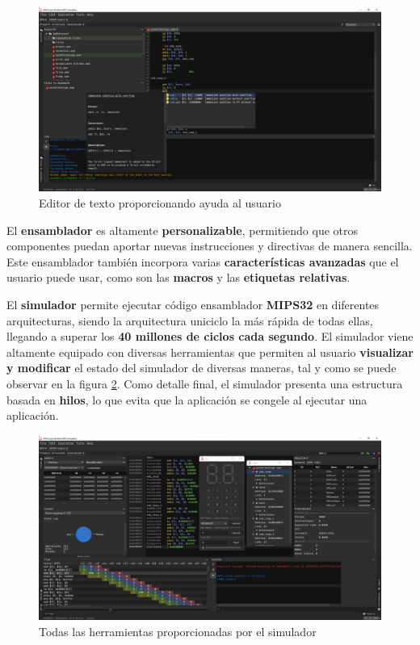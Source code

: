 \begin{figure}[h]
    \centering
    \includegraphics[width=\textwidth]{images/result/mips-editor}
    \caption{Editor de texto proporcionando ayuda al usuario}
    \label{fig:mips-editor}
\end{figure}

\noindent El \textbf{ensamblador} es altamente \textbf{personalizable},
permitiendo que otros componentes puedan aportar nuevas instrucciones y
directivas de manera sencilla.
Este ensamblador también incorpora varias \textbf{características avanzadas}
que el usuario puede usar, como son las \textbf{macros} y las
\textbf{etiquetas relativas}.

\noindent El \textbf{simulador} permite ejecutar código ensamblador
\textbf{MIPS32} en diferentes arquitecturas, siendo la arquitectura
uniciclo la más rápida de todas ellas, llegando a superar los
\textbf{40 millones de ciclos cada segundo}.
El simulador viene altamente equipado con diversas herramientas que
permiten al usuario \textbf{visualizar y modificar} el estado del simulador
de diversas maneras, tal y como se puede observar en la figura \ref{fig:mips-tools}.
Como detalle final, el simulador presenta una estructura basada en
\textbf{hilos}, lo que evita que la aplicación se congele al ejecutar
una aplicación.

\begin{figure}[h]
    \centering
    \includegraphics[width=\textwidth]{images/result/mips-tools}
    \caption{Todas las herramientas proporcionadas por el simulador}
    \label{fig:mips-tools}
\end{figure}
